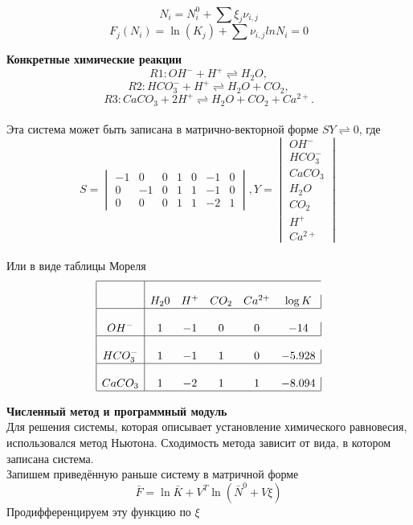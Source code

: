 \documentclass[10pt,a4paper]{article}
\begin{document}
 $$N_i = N_i^0 + \sum{\xi_j\nu_{i,j}}$$ $$F_j(N_i)=\ln(K_j) + \sum{\nu_{i,j}ln{N_i}} = 0$$ 
\par\textbf{Конкретные химические реакции}\\ 
$$R1: OH^{-} + H^{+} \rightleftharpoons H_2O,$$
$$R2: HCO_3^{-}+H^{+} \rightleftharpoons H_2O + CO_2,$$
$$R3: CaCO_3 + 2H^{+} \rightleftharpoons H_2O + CO_2 + Ca^{2+}.$$\\
Эта  система может быть записана в матрично-векторной форме $SY \rightleftharpoons 0$, где
$$S =  \begin{vmatrix}
-1 &0 &0  &1 &0 &-1 &0\\
0 &-1 &0  &1 &1 &-1 &0\\
0  &0 &0  &1 &1 &-2 &1
		\end{vmatrix},
  Y = \begin{vmatrix}
  OH^{-}\\
  HCO_3^{-}\\
  CaCO_3\\
  H_2O\\
  CO_2\\
  H^{+}\\
  Ca^{2+}
  \end{vmatrix}$$\\
Или в виде таблицы Мореля\\
$$\begin{array}{|c|ccccc|}
\hline\\
		&H_20	&H^{+}	&CO_2	&Ca^{2+}	&\log{K}\\
\hline\\
OH^{-}		&1		&-1		&0		  &0		&-14\\
\hline\\
HCO_3^{-}	&1		&-1		&1		  &0		&-5.928\\
\hline\\
CaCO_3		&1		&-2		&1		  &1		&-8.094\\
\hline
\end{array}$$
\par\textbf{Численный метод и программный модуль}\\
\hspace*{0.5cm}Для решения системы, которая описывает установление химического равновесия, использовался метод Ньютона. Сходимость метода зависит от вида, в котором записана система. \\
\hspace*{0.5cm} Запишем приведённую раньше систему в матричной форме$$\bar{F} = \ln{\bar{K}} + V^T \ln{(\bar{N}^0 + V\xi)}$$
\hspace*{0.5cm}Продифференцируем эту функцию по $\xi$
\end{document}
